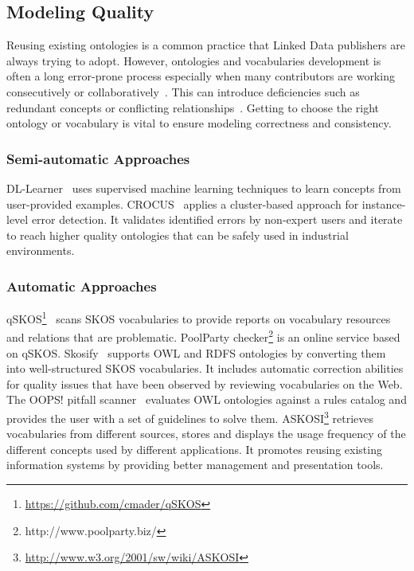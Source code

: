 \documentclass[onecolumn, crcready]{../../Tools/LaTEX/iosart2c}
\begin{document}
\subsection{Modeling Quality}
Reusing existing ontologies is a common practice that Linked Data publishers are always trying to adopt. However, ontologies and vocabularies development is often a long error-prone process especially when many contributors are working consecutively or collaboratively~\cite{Suominen:DataSemantics:13}. This can introduce deficiencies such as redundant concepts or conflicting relationships~\cite{Harpring:Getty:10}. Getting to choose the right ontology or vocabulary is vital to ensure modeling correctness and consistency.

\subsubsection{Semi-automatic Approaches}
DL-Learner~\cite{Lehmann:MLResearch:09} uses supervised machine learning techniques to learn concepts from user-provided examples. CROCUS~\cite{Cherix:WASABI:14} applies a cluster-based approach for instance-level error detection. It validates identified errors by non-expert users and iterate to reach higher quality ontologies that can be safely used in industrial environments.

\subsubsection{Automatic Approaches}
qSKOS\footnote{\url{https://github.com/cmader/qSKOS}}~\cite{Mader:TBDL:12} scans SKOS vocabularies to provide reports on vocabulary resources and relations that are problematic. PoolParty checker\footnote{http://www.poolparty.biz/} is an online service based on qSKOS. Skosify~\cite{Suominen:IKEM:12} supports OWL and RDFS ontologies by converting them into well-structured SKOS vocabularies. It includes automatic correction abilities for quality issues that have been observed by reviewing vocabularies on the Web. The OOPS! pitfall scanner~\cite{PovedaVillalon:EKAW:12} evaluates OWL ontologies against a rules catalog and provides the user with a set of guidelines to solve them. ASKOSI\footnote{\url{http://www.w3.org/2001/sw/wiki/ASKOSI}} retrieves vocabularies from different sources, stores and displays the usage frequency of the different concepts used by different applications. It promotes reusing existing information systems by providing better management and presentation tools.
\end{document}
